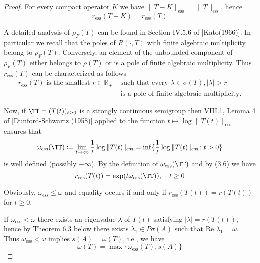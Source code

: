 \begin{proof}
For every compact operator $K$ we have $\|T - K\|_{\text{ess}} = \|T\|_{\text{ess}}$, hence
\begin{equation}\label{eq:a3-3.7}
	r_{\text{ess}}(T - K) = r_{\text{ess}}(T)
\end{equation}


\newpage
A detailed analysis of $\rho_{F}(T)$ can be found in Section IV.5.6 of [Kato(1966)].
In particular we recall that the poles of $R(\cdot,T)$ with finite algebraic multiplicity belong to $\rho_{F}(T)$.
Conversely, an element of the unbounded component of $\rho_{F}(T)$ either belongs to $\rho(T)$ or is a pole of finite algebraic multiplicity.
Thus $r_{\text{ess}}(T)$ can be characterized as follows
\begin{equation}\label{eq:a3-3.8}
	\begin{split}
	r_{\text{ess}}(T) \text{ is the smallest } r \in \mathbb{R}_{+} 
	& \text{ such that every } \lambda \in \sigma(T), |\lambda| > r \\
	& \text{ is a pole of finite algebraic multiplicity.}
	\end{split}
\end{equation}

Now, if $\TT = (T(t))_{t \geq 0}$ is a strongly continuous semigroup then VIII.1, Lemma 4 of [Dunford-Schwartz (1958)] applied to the function $t \mapsto \log \|T(t)\|_{\text{ess}}$ ensures that
\begin{equation}\label{eq:a3-3.9}
	\omega_{\text{ess}}(\TT) \coloneqq \lim_{t \to \infty} \frac{1}{t} \log\|T(t)\|_{\text{ess}} = \inf \{\frac{1}{t} \log\|T(t)\|_{\text{ess}} \colon t > 0\}
\end{equation}
is well defined (possibly $-\infty$).
By the definition of $\omega_{\text{ess}}(\TT)$ and by (3.6) we have
\begin{equation}\label{eq:a3-3.10}
	r_{\text{ess}}(T(t)) = \exp(t\omega_{\text{ess}}(\TT)), \quad t \geq 0
\end{equation}

Obviously, $\omega_{\text{ess}} \leq \omega$ and equality occurs if and only if $r_{\text{ess}}(T(t)) = r(T(t))$ for $t \geq 0$.

If $\omega_{\text{ess}} < \omega$ there exists an eigenvalue $\lambda$ of $T(t)$ satisfying $|\lambda| = r(T(t))$, hence by Theorem 6.3 below there exists $\lambda_{1} \in P\sigma(A)$ such that $\text{Re }\lambda_{1} = \omega$.
Thus $\omega_{\text{ess}} < \omega$ implies $s(A) = \omega(T)$, i.e., we have
\begin{equation}\label{eq:a3-3.11}
	\omega(T) = \max\{\omega_{\text{ess}}(T),s(A)\}
\end{equation}


\end{proof}
